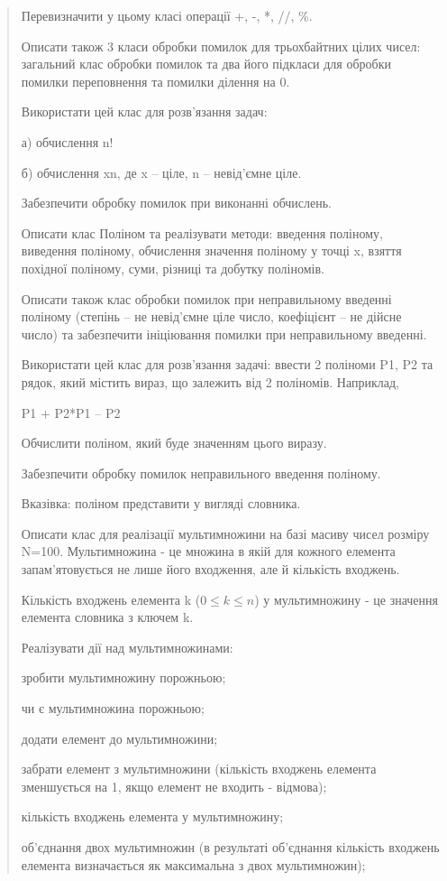 \documentclass[]{article}
\begin{document}
\begin{quote}
Перевизначити у цьому класі операції +, -, *, //, \%.

Описати також 3 класи обробки помилок для трьохбайтних цілих чисел:
загальний клас обробки помилок та два його підкласи для обробки помилки
переповнення та помилки ділення на 0.

Використати цей клас для розв'язання задач:

а) обчислення n!

б) обчислення xn, де x -- ціле, n -- невід'ємне ціле.

Забезпечити обробку помилок при виконанні обчислень.

Описати клас Поліном та реалізувати методи: введення поліному, виведення
поліному, обчислення значення поліному у точці x, взяття похідної
поліному, суми, різниці та добутку поліномів.

Описати також клас обробки помилок при неправильному введенні поліному
(степінь -- не невід'ємне ціле число, коефіцієнт -- не дійсне число) та
забезпечити ініціювання помилки при неправильному введенні.

Використати цей клас для розв'язання задачі: ввести 2 поліноми P1, P2 та
рядок, який містить вираз, що залежить від 2 поліномів. Наприклад,

P1 + P2*P1 -- P2

Обчислити поліном, який буде значенням цього виразу.

Забезпечити обробку помилок неправильного введення поліному.

Вказівка: поліном представити у вигляді словника.

Описати клас для реалізації мультимножини на базі масиву чисел розміру
N=100. Мультимножина - це множина в якій для кожного елемента
запам'ятовується не лише його входження, але й кількість входжень.

Кількість входжень елемента k (\(0 \leq k \leq n\)) у мультимножину - це
значення елемента словника з ключем k.

Реалізувати дії над мультимножинами:

зробити мультимножину порожньою;

чи є мультимножина порожньою;

додати елемент до мультимножини;

забрати елемент з мультимножини (кількість входжень елемента зменшується
на 1, якщо елемент не входить - відмова);

кількість входжень елемента у мультимножину;

об'єднання двох мультимножин (в результаті об'єднання кількість входжень
елемента визначається як максимальна з двох мультимножин);


\end{quote}
\end{document}

